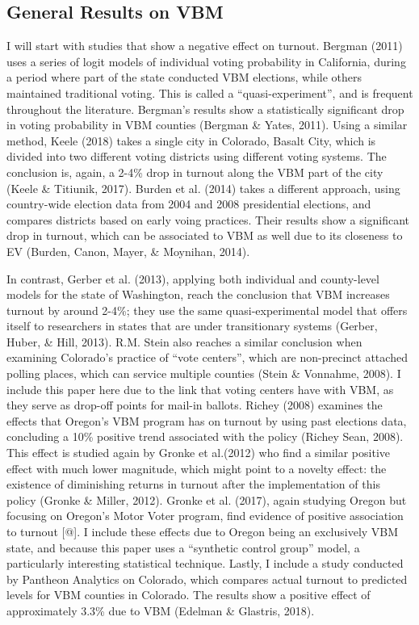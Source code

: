 \documentclass[12pt,twoside]{reedthesis}
\begin{document}
  \subsection{General Results on VBM}\label{general-results-on-vbm}
  
  I will start with studies that show a negative effect on turnout.
  Bergman (2011) uses a series of logit models of individual voting
  probability in California, during a period where part of the state
  conducted VBM elections, while others maintained traditional voting.
  This is called a ``quasi-experiment'', and is frequent throughout the
  literature. Bergman's results show a statistically significant drop in
  voting probability in VBM counties (Bergman \& Yates, 2011). Using a
  similar method, Keele (2018) takes a single city in Colorado, Basalt
  City, which is divided into two different voting districts using
  different voting systems. The conclusion is, again, a 2-4\% drop in
  turnout along the VBM part of the city (Keele \& Titiunik, 2017). Burden
  et al. (2014) takes a different approach, using country-wide election
  data from 2004 and 2008 presidential elections, and compares districts
  based on early voing practices. Their results show a significant drop in
  turnout, which can be associated to VBM as well due to its closeness to
  EV (Burden, Canon, Mayer, \& Moynihan, 2014).
  
  In contrast, Gerber et al. (2013), applying both individual and
  county-level models for the state of Washington, reach the conclusion
  that VBM increases turnout by around 2-4\%; they use the same
  quasi-experimental model that offers itself to researchers in states
  that are under transitionary systems (Gerber, Huber, \& Hill, 2013).
  R.M. Stein also reaches a similar conclusion when examining Colorado's
  practice of ``vote centers'', which are non-precinct attached polling
  places, which can service multiple counties (Stein \& Vonnahme, 2008). I
  include this paper here due to the link that voting centers have with
  VBM, as they serve as drop-off points for mail-in ballots. Richey (2008)
  examines the effects that Oregon's VBM program has on turnout by using
  past elections data, concluding a 10\% positive trend associated with
  the policy (Richey Sean, 2008). This effect is studied again by Gronke
  et al.(2012) who find a similar positive effect with much lower
  magnitude, which might point to a novelty effect: the existence of
  diminishing returns in turnout after the implementation of this policy
  (Gronke \& Miller, 2012). Gronke et al. (2017), again studying Oregon
  but focusing on Oregon's Motor Voter program, find evidence of positive
  association to turnout {[}@{]}. I include these effects due to Oregon
  being an exclusively VBM state, and because this paper uses a
  ``synthetic control group'' model, a particularly interesting
  statistical technique. Lastly, I include a study conducted by Pantheon
  Analytics on Colorado, which compares actual turnout to predicted levels
  for VBM counties in Colorado. The results show a positive effect of
  approximately 3.3\% due to VBM (Edelman \& Glastris, 2018).
  
\end{document}
